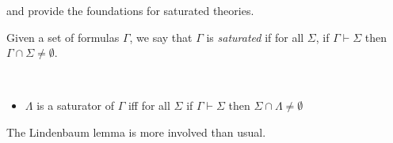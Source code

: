 \documentclass[10pt]{article}
\begin{document}
\textcite{Thomason:1968aa} and \textcite{Aczel:1968aa} provide the foundations for saturated theories.

\begin{definition}[Saturation]
  Given a set of formulas \(\Gamma\), we say that \(\Gamma\) is \emph{saturated} if for all \(\Sigma\), if \(\Gamma \vdash \Sigma\) then \(\Gamma \cap \Sigma \ne \emptyset\).
\end{definition}

\begin{definition}[Saturators]
  \mbox{ }
  \begin{itemize}
  \item \(\Lambda\) is a saturator of \(\Gamma\) iff for all \(\Sigma\) if \(\Gamma \vdash \Sigma\) then \(\Sigma \cap \Lambda \ne \emptyset\)
  \end{itemize}
\end{definition}


The Lindenbaum lemma is more involved than usual.
\end{document}
